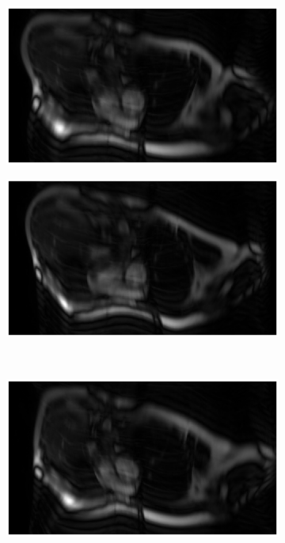 \begin{figure}[h] %
	\centering
	\begin{subfigure}{0.475\textwidth}
    		\includegraphics[width=\textwidth]{./Images/LungMotion1.png}
    		\label{fig:LungMotion1}
	\end{subfigure}
	\hfill
	\begin{subfigure}{0.475\textwidth}
    		\includegraphics[width=\textwidth]{./Images/LungMotion2.png}
    		\label{fig:LungMotion2}
	\end{subfigure}
	\\
	\begin{subfigure}{0.475\textwidth}
    		\includegraphics[width=\textwidth]{./Images/LungMotion3.png}

\end{subfigure}
\end{figure}
